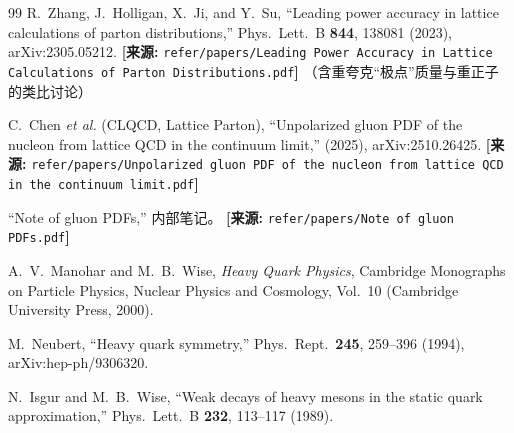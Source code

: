 \documentclass[12pt,a4paper]{ctexart}
\theoremstyle{definition}
\begin{document}
\begin{thebibliography}{99}
R.~Zhang, J.~Holligan, X.~Ji, and Y.~Su,
``Leading power accuracy in lattice calculations of parton distributions,''
Phys.\ Lett.\ B \textbf{844}, 138081 (2023), arXiv:2305.05212.
\quad\textbf{[来源:} \texttt{refer/papers/Leading Power Accuracy in Lattice Calculations of Parton Distributions.pdf}\textbf{]}
（含重夸克``极点''质量与重正子的类比讨论）

C.~Chen \textit{et al.} (CLQCD, Lattice Parton),
``Unpolarized gluon PDF of the nucleon from lattice QCD in the continuum limit,''
(2025), arXiv:2510.26425.
\quad\textbf{[来源:} \texttt{refer/papers/Unpolarized gluon PDF of the nucleon from lattice QCD in the continuum limit.pdf}\textbf{]}

``Note of gluon PDFs,'' 内部笔记。
\quad\textbf{[来源:} \texttt{refer/papers/Note of gluon PDFs.pdf}\textbf{]}

A.~V.~Manohar and M.~B.~Wise,
\textit{Heavy Quark Physics}, Cambridge Monographs on Particle Physics, Nuclear Physics and Cosmology, Vol.~10 (Cambridge University Press, 2000).

M.~Neubert,
``Heavy quark symmetry,''
Phys.\ Rept.\ \textbf{245}, 259--396 (1994), arXiv:hep-ph/9306320.

N.~Isgur and M.~B.~Wise,
``Weak decays of heavy mesons in the static quark approximation,''
Phys.\ Lett.\ B \textbf{232}, 113--117 (1989).

\end{thebibliography}
\end{document}
